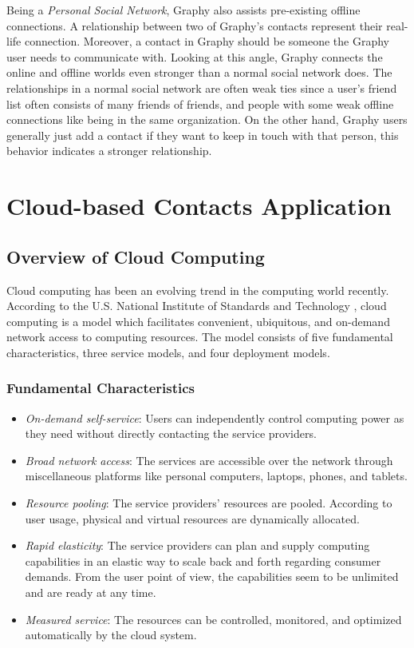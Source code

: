 Being a \textit{Personal Social Network}, Graphy also assists pre-existing offline connections. A relationship between two of Graphy's contacts represent their real-life connection. Moreover, a contact in Graphy should be someone the Graphy user needs to communicate with. Looking at this angle, Graphy connects the online and offline worlds even stronger than a normal social network does. The relationships in a normal social network are often weak ties \cite{boyd2010social} since a user's friend list often consists of many friends of friends, and people with some weak offline connections like being in the same organization. On the other hand, Graphy users generally just add a contact if they want to keep in touch with that person, this behavior indicates a stronger relationship.

\section{Cloud-based Contacts Application}\label{cloudcontact}
\subsection{Overview of Cloud Computing}
Cloud computing has been an evolving trend in the computing world recently. According to the U.S. National Institute of Standards and Technology \cite{mell2011nist}, cloud computing is a model which facilitates convenient, ubiquitous, and on-demand network access to computing resources. The model consists of five fundamental characteristics, three service models, and four deployment models.

\subsubsection{Fundamental Characteristics}

\begin{itemize}
    \item \textit{On-demand self-service}: Users can independently control computing power as they need without directly contacting the service providers.
    \item \textit{Broad network access}: The services are accessible over the network through miscellaneous platforms like personal computers, laptops, phones, and tablets.
    \item \textit{Resource pooling}: The service providers' resources are pooled. According to user usage, physical and virtual resources are dynamically allocated.
    \item \textit{Rapid elasticity}: The service providers can plan and supply computing capabilities in an elastic way to scale back and forth regarding consumer demands. From the user point of view, the capabilities seem to be unlimited and are ready at any time.
    \item \textit{Measured service}: The resources can be controlled, monitored, and optimized automatically by the cloud system.
\end{itemize}

